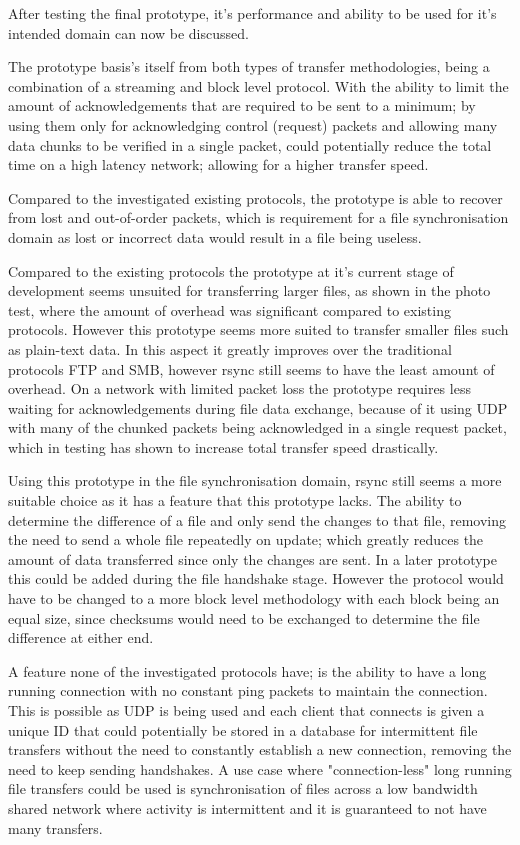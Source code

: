 After testing the final prototype, it's performance and ability to be used for it's intended domain can now be discussed.

The prototype basis's itself from both types of transfer methodologies, being a combination of a streaming and block level protocol. With the ability to limit the amount of acknowledgements that are required to be sent to a minimum; by using them only for acknowledging control (request) packets and allowing many data chunks to be verified in a single packet, could potentially reduce the total time on a high latency network; allowing for a higher transfer speed.

Compared to the investigated existing protocols, the prototype is able to recover from lost and out-of-order packets, which is requirement for a file synchronisation domain as lost or incorrect data would result in a file being useless.

Compared to the existing protocols the prototype at it's current stage of development seems unsuited for transferring larger files, as shown in the photo test, where the amount of overhead was significant compared to existing protocols. However this prototype seems more suited to transfer smaller files such as plain-text data. In this aspect it greatly improves over the traditional protocols FTP and SMB, however rsync still seems to have the least amount of overhead. On a network with limited packet loss the prototype requires less waiting for acknowledgements during file data exchange, because of it using UDP with many of the chunked packets being acknowledged in a single request packet, which in testing has shown to increase total transfer speed drastically.

Using this prototype in the file synchronisation domain, rsync still seems a more suitable choice as it has a feature that this prototype lacks. The ability to determine the difference of a file and only send the changes to that file, removing the need to send a whole file repeatedly on update; which greatly reduces the amount of data transferred since only the changes are sent. In a later prototype this could be added during the file handshake stage. However the protocol would have to be changed to a more block level methodology with each block being an equal size, since checksums would need to be exchanged to determine the file difference at either end.

A feature none of the investigated protocols have; is the ability to have a long running connection with no constant ping packets to maintain the connection. This is possible as UDP is being used and each client that connects is given a unique ID that could potentially be stored in a database for intermittent file transfers without the need to constantly establish a new connection, removing the need to keep sending handshakes. A use case where "connection-less" long running file transfers could be used is synchronisation of files across a low bandwidth shared network where activity is intermittent and it is guaranteed to not have many transfers.
